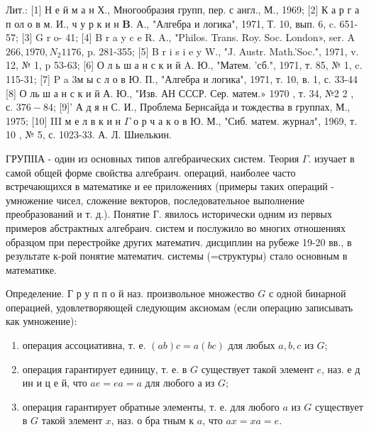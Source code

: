 \documentclass[10pt]{article}
\begin{document}
Лит.: [1] Н е й м а н Х., Многообразия групп, пер. с англ., М., 1969; [2] К а р г а п ол о в м. И., ч у р к и н $\mathbf{B}$. А., "Алгебра и логика", 1971, Т. 10, вып. 6, c. 651-57; [3] G r o- 41; [4] B r a y c e R. A., "Philos. Trans. Roy. Soc. London», ser. A $266,1970, N_{2} 1176$, p. 281-355; [5] B r i s i e y W., "J. Austr. Math.'Soc.", 1971, v. 12, № 1, p 53-63; [6] О л ь ш а н с к и й A. Ю., "Матем. 'сб.", 1971, т. 85, № 1, c. 115-31; [7] P a 3м ы с л о в Ю. П., "Алгебра и логика", 1971, т. 10, в. 1, с. 33-44 [8] О ль ш а н с к и й А. Ю., "Изв. АН СССР. Сер. матем.» 1970 , т. 34, №2 2 , с. $376-84$; [9]' А д я н С. И., Проблема Бернсайда и тождества в группах, М., 1975; [10] III м е л в к и н $\Gamma$ о р ч а к о в Ю. М., "Сиб. матем. журнал", 1969, т. 10 , № 5, с. 1023-33. А. Л. Шиелькин.



ГРУПІІА - один из основных типов алгебраических систем. Теория $\Gamma$. изучает в самой общей форме свойства алгебраич. операций, наиболее часто встречающихся в математике и ее приложениях (примеры таких операций - умножение чисел, сложение векторов, последовательное выполнение преобразований и т. д.). Понятие Г. явилось исторически одним из первых примеров абстрактных алгебраич. систем и послужило во многих отношениях образцом при перестройке других математич. дисциплин на рубеже 19-20 вв., в результате к-рой понятие математич. системы (=структуры) стало основным в математике.



Определение. Г р у п п о й наз. произвольное множество $G$ с одной бинарной операцией, удовлетворяющей следующим аксиомам (если операцию записывать как умножение):



\begin{enumerate}

  \item операция ассоциативна, т. е. $(a b) c=a(b c)$ для любых $a, b, c$ из $G$;



  \item операция гарантирует единицу, т. е. в $G$ существует такой элемент $e$, наз. е д ин и ц е й, что $a e=e a=a$ для любого $а$ из $G$;



  \item операция гарантирует обратные элементы, т. е. для любого $a$ из $G$ существует в $G$ такой элемент $x$, наз. о бра тным к $a$, что $a x=x a=e$.



\end{enumerate}
\end{document}
